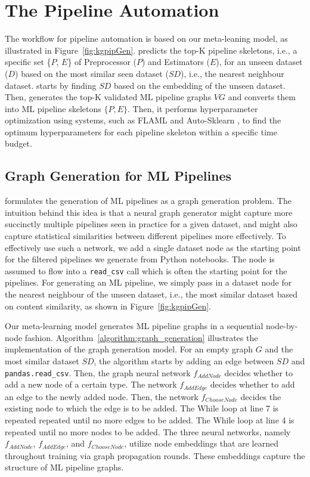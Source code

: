 \section{The {\sysname} Pipeline Automation}
\label{sec:kgpipGen}

The {\sysname} workflow for pipeline automation is based on our meta-leaning model, as illustrated in Figure~\ref{fig:kgpipGen}. {\sysname} predicts the top-K pipeline skeletons, i.e., a specific set \{$P$, $E$\} of Preprocessor ($P$) and Estimators ($E$), for an unseen dataset ($D$) based on the most similar seen dataset ($SD$), i.e., the nearest neighbour dataset.
{\sysname} starts by finding $SD$ based on the embedding of the unseen dataset. Then, {\sysname} generates the top-K validated ML pipeline graphs $VG$ and converts them into ML pipeline skeletons $\{P,E\}$. Then, it performs hyperparameter optimization using systems, such as  FLAML \cite{flaml} and Auto-Sklearn \cite{autosklearn}, to find the optimum hyperparameters for each pipeline skeleton within a specific time budget.




\subsection{Graph Generation for ML Pipelines}
{\sysname} formulates the generation of ML pipelines as a graph generation problem. The intuition behind this idea is that a neural graph generator might capture more succinctly multiple pipelines seen in practice for a given dataset, and might also capture statistical similarities between different pipelines more effectively. To effectively use such a network, we add a single dataset node as the starting point for the filtered pipelines we generate from Python notebooks. The node is assumed to flow into a \texttt{read\_csv} call which is often the starting point for the pipelines. For generating an ML pipeline, we simply pass in a dataset node for the nearest neighbour of the unseen dataset, i.e., the most similar dataset based on content similarity, as shown in Figure~\ref{fig:kgpipGen}.



Our meta-learning model generates ML pipeline graphs in a sequential node-by-node fashion. Algorithm~\ref{algorithm:graph_generation} illustrates the implementation of the graph generation model. For an empty graph $G$ and the most similar dataset $SD$, the algorithm starts by adding an edge between $SD$ and \texttt{pandas.read\_csv}. Then, the graph neural network $f_{AddNode}$ decides whether to add a new node of a certain type. The network $f_{AddEdge}$ decides whether to add an edge to the newly added node. Then, the network $f_{ChooseNode}$ decides the existing node to which the edge is to be added. The While loop at line 7 is repeated repeated until no more edges to be added.  The While loop at line 4 is repeated until no more nodes to be added. The three neural networks, namely $f_{AddNode}$, $f_{AddEdge}$, and  $f_{ChooseNode}$, utilize node embeddings that are learned throughout training via graph propagation rounds. These embeddings capture the structure of ML pipeline graphs.

